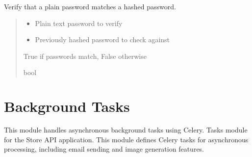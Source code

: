 \documentclass[letterpaper,10pt,openany,oneside,english]{sphinxmanual}
\begin{document}
\begin{savenotes}\begin{fulllineitems}
\label{\detokenize{modules/security:storeapi.security.verify_password}}
\pysigstartsignatures
{}
\pysigstopsignatures
\sphinxAtStartPar
Verify that a plain password matches a hashed password.
\begin{quote}\begin{description}
\begin{itemize}
\item {} 
\sphinxAtStartPar
{} \textendash{} Plain text password to verify

\item {} 
\sphinxAtStartPar
{} \textendash{} Previously hashed password to check against

\end{itemize}

\sphinxAtStartPar
True if passwords match, False otherwise

\sphinxAtStartPar
bool

\end{description}\end{quote}

\end{fulllineitems}\end{savenotes}


\sphinxstepscope


\chapter{Background Tasks}
\label{\detokenize{modules/tasks:background-tasks}}\label{\detokenize{modules/tasks::doc}}
\sphinxAtStartPar
This module handles asynchronous background tasks using Celery.
\label{\detokenize{modules/tasks:module-storeapi.tasks}}
\sphinxAtStartPar
Tasks module for the Store API application.
This module defines Celery tasks for asynchronous processing,
including email sending and image generation features.
\end{document}
